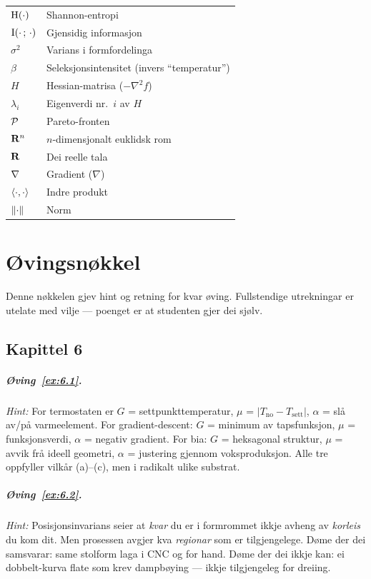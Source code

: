 {\begin{longtable}{@{}p{28mm}p{62mm}@{}}
\addlinespace
$\operatorname{H}(\cdot)$ & Shannon-entropi \\
$\operatorname{I}(\cdot\,;\,\cdot)$ & Gjensidig informasjon \\
$\sigma^2$ & Varians i formfordelinga \\
$\beta$ & Seleksjonsintensitet (invers ``temperatur'') \\
$H$ & Hessian-matrisa ($-\nabla^2 f$) \\
$\lambda_i$ & Eigenverdi nr.~$i$ av $H$ \\
\addlinespace
$\mathcal{P}$ & Pareto-fronten \\
$\mathbf{R}^n$ & $n$-dimensjonalt euklidsk rom \\
$\mathbf{R}$ & Dei reelle tala \\
$\operatorname{\nabla}$ & Gradient ($\nabla$) \\
$\langle \cdot, \cdot \rangle$ & Indre produkt \\
$\lVert \cdot \rVert$ & Norm \\
\end{longtable}
}


\chapter{Øvingsnøkkel}
\label{app:ovingsnokkel}

Denne nøkkelen gjev hint og retning for kvar øving. Fullstendige
utrekningar er utelate med vilje --- poenget er at studenten gjer
dei sjølv.

\section*{Kapittel 6}

\paragraph{Øving~\ref{ex:6.1}.}
\emph{Hint:} For termostaten er $G$ = settpunkttemperatur,
$\mu$ = $|T_{\text{no}} - T_{\text{sett}}|$, $\alpha$ = slå av/på
varmeelement. For gradient-descent: $G$ = minimum av tapsfunksjon,
$\mu$ = funksjonsverdi, $\alpha$ = negativ gradient.
For bia: $G$ = heksagonal struktur, $\mu$ = avvik frå ideell
geometri, $\alpha$ = justering gjennom voksproduksjon. Alle tre
oppfyller vilkår (a)--(c), men i radikalt ulike substrat.

\paragraph{Øving~\ref{ex:6.2}.}
\emph{Hint:} Posisjonsinvarians seier at \emph{kvar} du er i
formrommet ikkje avheng av \emph{korleis} du kom dit. Men
prosessen avgjer kva \emph{regionar} som er tilgjengelege.
Døme der dei samsvarar: same stolform laga i CNC og for hand.
Døme der dei ikkje kan: ei dobbelt-kurva flate som krev dampbøying
--- ikkje tilgjengeleg for dreiing.

